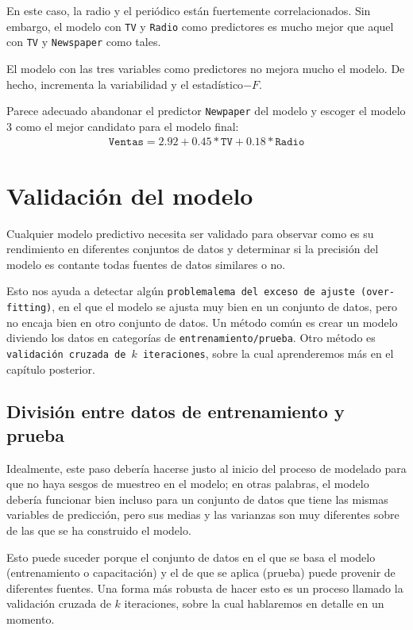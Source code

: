 En este caso, la radio y el periódico están fuertemente correlacionados. Sin embargo, el modelo con \texttt{TV} y \texttt{Radio} como predictores es mucho mejor que aquel con \texttt{TV} y \texttt{Newspaper} como tales.


El modelo con las tres variables como predictores no mejora mucho el modelo. De hecho, incrementa la variabilidad y el estadístico$-F.$


Parece adecuado abandonar el predictor \texttt{Newpaper} del modelo y escoger el modelo 3 como el mejor candidato para el modelo final:
\begin{align}
 \texttt{Ventas} = 2.92 + 0.45*\texttt{TV} + 0.18*\texttt{Radio}
\end{align}


\section{Validación del modelo}

Cualquier modelo predictivo necesita ser validado para observar como es su rendimiento en diferentes conjuntos de datos  y determinar si la precisión del modelo es contante todas fuentes de datos similares o no.


Esto nos ayuda a detectar algún \texttt{problemalema del exceso de ajuste (over-fitting)}, en el que el modelo se ajusta
muy bien en un conjunto de datos, pero no encaja bien en otro conjunto de datos. Un método común es crear un modelo diviendo los datos en categorías de \texttt{entrenamiento/prueba}. Otro método es
\texttt{validación cruzada de $k$ iteraciones}, sobre la cual aprenderemos más en el capítulo posterior.

\subsection{División entre datos de entrenamiento y prueba}

Idealmente, este paso debería hacerse justo al inicio del proceso de modelado para que
no haya sesgos de muestreo en el modelo; en otras palabras, el modelo debería funcionar
bien incluso para un conjunto de datos que tiene las mismas variables de predicción, pero sus medias y
las varianzas son muy diferentes sobre de las que se ha construido el modelo.


Esto puede
suceder porque el conjunto de datos en el que se basa el modelo (entrenamiento o capacitación) y el de
que se aplica (prueba) puede provenir de diferentes fuentes. Una forma más robusta de
hacer esto es un proceso llamado la validación cruzada de $k$ iteraciones, sobre la cual hablaremos en
detalle en un momento.


